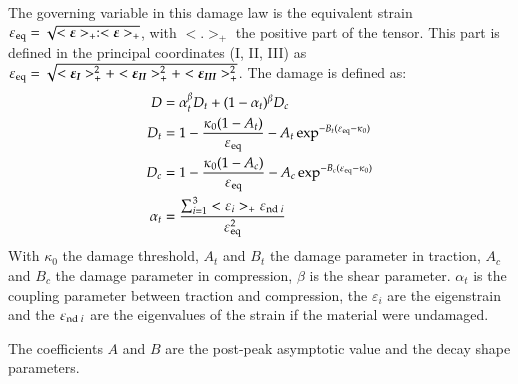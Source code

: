 The governing variable in this damage
law is the equivalent strain $\varepsilon_{{\mathrm{eq}}} =
\sqrt{<\boldsymbol{\varepsilon}>_+:<\boldsymbol{\varepsilon}>_+}$, with $<.>_+$ the positive
part of the tensor. This part is defined in the principal coordinates (I, II, III) as $\varepsilon_{{\mathrm{eq}}} =
\sqrt{<\boldsymbol{\varepsilon_I}>_+^2 + <\boldsymbol{\varepsilon_{II}}>_+^2 + <\boldsymbol{\varepsilon_{III}}>_+^2}$.
The damage is defined as:
\begin{align}
  D &= \alpha_t^\beta D_t + (1-\alpha_t)^\beta D_c\\
  D_t &= 1 - \frac{\kappa_0 (1- A_t)}{\varepsilon_{{\mathrm{eq}}}} - A_t \exp^{-B_t(\varepsilon_{{\mathrm{eq}}}-\kappa_0)}\\
  D_c &= 1 - \frac{\kappa_0 (1- A_c)}{\varepsilon_{{\mathrm{eq}}}} - A_c
  \exp^{-B_c(\varepsilon_{{\mathrm{eq}}}-\kappa_0)}\\
  \alpha_t &= \frac{\sum_{i=1}^3<\varepsilon_i>_+\varepsilon_{{\mathrm{nd}}\;i}}{\varepsilon_{{\mathrm{eq}}}^2}
\end{align}
With $\kappa_0$ the damage threshold, $A_t$ and $B_t$ the damage parameter in
traction, $A_c$ and $B_c$ the damage parameter in compression, $\beta$ is the
shear parameter. $\alpha_t$ is the coupling parameter between traction and
compression, the $\varepsilon_i$ are the eigenstrain and the
$\varepsilon_{{\mathrm{nd}}\;i}$ are the eigenvalues of the strain if the material
were undamaged.

The coefficients $A$ and $B$ are the post-peak asymptotic
value and the decay shape parameters.






